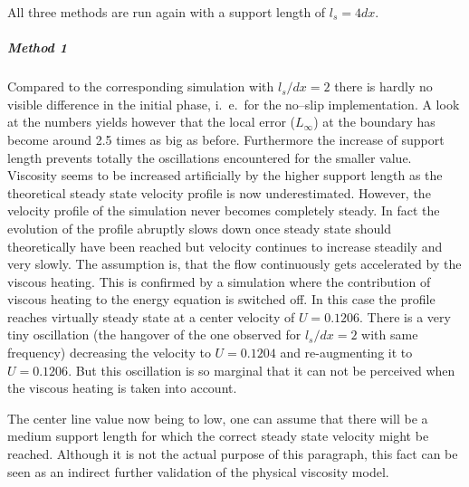 \documentclass[11pt,a4paper,twoside]{report}
\begin{document}
All three methods are run again with a support length of $l_s=4dx$.

\subparagraph{Method 1}
Compared to the corresponding simulation with $l_s/dx=2$ there is hardly no visible difference in the initial phase, i.\ e.\ for the no--slip implementation. A look at the numbers yields however that the local error ($L_\infty$) at the boundary has become around 2.5 times as big as before. Furthermore the increase of support length prevents totally the oscillations encountered for the smaller value. Viscosity seems to be increased artificially by the higher support length as the theoretical steady state velocity profile is now underestimated. However, the velocity profile of the simulation never becomes completely steady. In fact the evolution of the profile abruptly slows down once steady state should theoretically have been reached  but velocity continues to increase steadily and very slowly. The assumption is, that the flow continuously gets accelerated by the viscous heating. This is confirmed by a simulation where the contribution of viscous heating to the energy equation is switched off. In this case the profile reaches virtually steady state at a center velocity of $U=0.1206$. There is a very tiny oscillation (the hangover of the one observed for $l_s/dx=2$ with same frequency) decreasing the velocity to $U=0.1204$ and re-augmenting it to $U=0.1206$. But this oscillation is so marginal that it can not be perceived when the viscous heating is taken into account.

The center line value now being to low, one can assume that there will be a medium support length for which the correct steady state velocity might be reached. Although it is not the actual purpose of this paragraph, this fact can be seen as an indirect further validation of the physical viscosity model.
\end{document}
